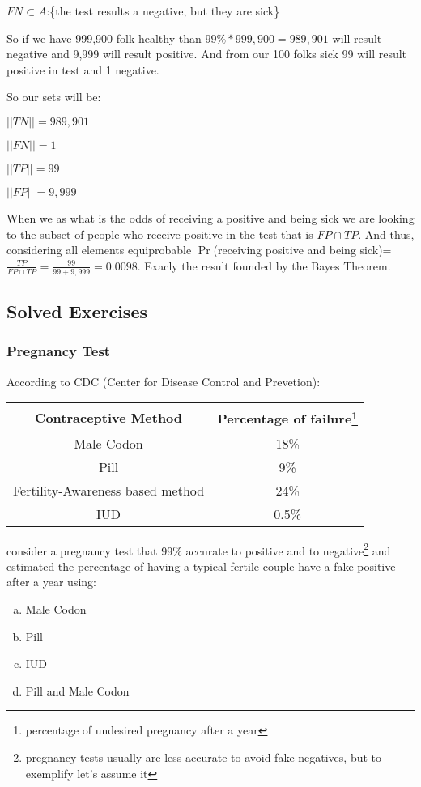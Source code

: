 \documentclass{book} %
\begin{document}
$FN \subset A$:\{the test results a negative, but they are sick\}

So if we have 999,900 folk healthy than $99\%*999,900 = 989,901$ will result negative and 9,999 will result positive. And from our 100 folks sick 99 will result positive in test and 1 negative.

So our sets will be:

$||TN|| = 989,901$

$||FN|| = 1$

$||TP|| = 99$

$||FP|| = 9,999$

When we as what is the odds of receiving a positive and being sick we are looking to the subset of people who receive positive in the test that is $FP \cap TP$. And thus, considering all elements equiprobable $\Pr$(receiving positive and being sick)=$\frac{TP}{FP \cap TP} = \frac{99}{99+9,999}=0.0098$. Exacly the result founded by the Bayes Theorem.


\subsection{Solved Exercises}



\subsubsection{Pregnancy Test}

    According to CDC (Center for Disease Control and Prevetion):
    

    \begin{center}
     \begin{tabular}{||c | c||} 
     \hline
     Contraceptive Method & Percentage of failure\footnote{percentage of undesired pregnancy after a year} \\ [0.9ex] 
     \hline\hline
     Male Codon & 18\% \\ 
    \hline
    Pill & 9\% \\ 
    \hline
    Fertility-Awareness based method & 24\% \\ 
    \hline
    IUD & 0.5\% \\
    \hline
    \end{tabular}
    \end{center}
    consider a pregnancy test that 99\% accurate to positive and to negative\footnote{pregnancy tests usually are less accurate to avoid fake negatives, but to exemplify let's assume it}  and estimated the percentage of having a typical fertile couple have a fake positive after a year using:
    \begin{enumerate}[(a)]
        \item Male Codon
        \item Pill
        \item IUD
        \item Pill and Male Codon
    \end{enumerate}
    
\end{document}
